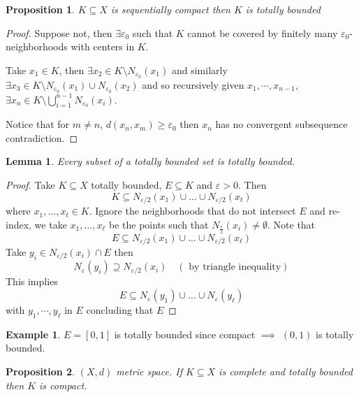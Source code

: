 \documentclass[11pt,openany]{book}
\theoremstyle{plain}
\newtheorem{lemma}{Lemma}[chapter]
\newtheorem{proposition}{Proposition}[chapter]
\theoremstyle{definition}
\newtheorem{example}{Example}[chapter]
\theoremstyle{remark}
\newcommand{\eps}{\varepsilon}
\begin{document}
\begin{proposition}\label{prop:seqimplytotally}
    $K\subseteq X$ is sequentially compact then $K$ is totally bounded
\end{proposition}

\begin{proof}
    Suppose not, then $ \exists \eps_0$ such that $K$ cannot be covered by finitely many $\eps_0$-neighborhoods with centers in $K$. 
    
    Take $x_1\in K$, then $\exists x_2 \in K \setminus N_{\eps_0}(x_1)$ and similarly $\exists x_3 \in K \setminus N_{\eps_0}(x_1)\cup N_{\eps_0}(x_2)$ and so recursively given $x_1,\cdots, x_{n-1}$,  $\exists x_n \in K \setminus \bigcup\limits_{i=1}^{n-1} N_{\eps_0}(x_i)$. 
    
    Notice that for $m\neq n$,  $d(x_n, x_m) \ge \eps_0$ then $x_n$ has no convergent subsequence contradiction.
\end{proof}

\begin{lemma}
    Every subset of a totally bounded set is totally bounded.
\end{lemma}
\begin{proof}
    Take $K \subseteq X$ totally bounded, $E \subseteq K$ and $\eps>0$. Then 
    \[K \subseteq N_{\eps/2}(x_1) \cup \dots \cup N_{\eps/2}(x_t)\]
    where $x_1, \dots , x_t \in K$. Ignore the neighborhoods that do not intersect $E$ and re-index, we take $x_1, \dots , x_{\ell}$ be the points such that $N_{\frac{\eps}{2}}(x_i) \ne \emptyset$. Note that
    \[ E \subseteq N_{\eps/2}(x_1) \cup \dots \cup N_{\eps/2}(x_\ell)\]
    Take $y_i \in N_{\eps/2}(x_i) \cap E$ then
    \[N_{\eps}(y_i) \supseteq N_{\eps/2}(x_i) \quad (\text{ by triangle inequality})\] 
    This implies \[E \subseteq N_\eps(y_1) \cup \dots \cup N_\eps(y_\ell)\]
    with $y_1,\cdots,y_{\ell}$ in $E$ concluding that $E$ 
\end{proof}

\begin{example}
    $E = [0,1]$ is totally bounded since compact $\implies$ $(0,1)$ is totally bounded.
\end{example}

\begin{proposition}\label{prop:final implication}
    $(X,d)$ metric space. If $K \subseteq X$ is complete and totally bounded then $K$ is compact.
\end{proposition}
\end{document}

